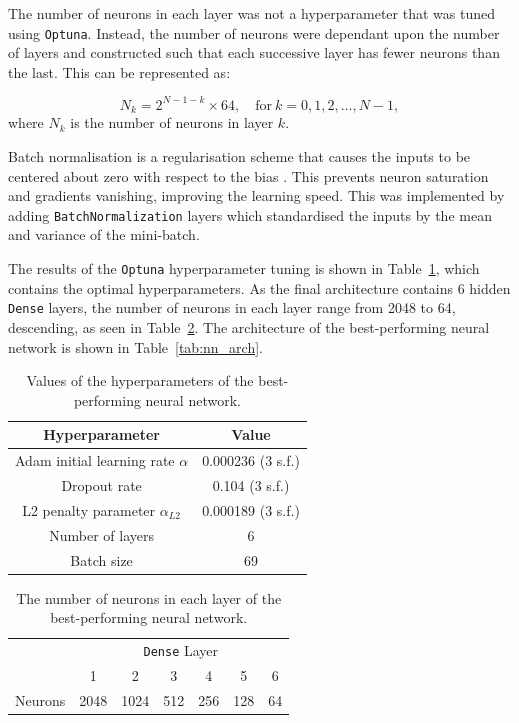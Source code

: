 \documentclass[11pt,a4paper]{article}
\begin{document}
The number of neurons in each layer was not a hyperparameter that was tuned using \texttt{Optuna}. Instead, the number of neurons were dependant upon the number of layers and constructed such that each successive layer has fewer neurons than the last. This can be represented as:

\begin{equation}
    N_k = 2^{N-1-k} \times 64, \quad\mathrm{for}\ k=0, 1, 2, \dots, N-1,
\end{equation}
where $N_k$ is the number of neurons in layer $k$.

Batch normalisation is a regularisation scheme that causes the inputs to be centered about zero with respect to the bias \citep{Mehta_2019}. This prevents neuron saturation and gradients vanishing, improving the learning speed. This was implemented by adding \texttt{BatchNormalization} layers which standardised the inputs by the mean and variance of the mini-batch.

The results of the \texttt{Optuna} hyperparameter tuning is shown in Table~\ref{tab:nn_hyperparameter}, which contains the optimal hyperparameters. As the final architecture contains 6 hidden \texttt{Dense} layers, the number of neurons in each layer range from 2048 to 64, descending, as seen in Table~\ref{tab:neurons}. The architecture of the best-performing neural network is shown in Table~\ref{tab:nn_arch}.

\begin{table}[ht]
    \centering
    \begin{tabular}{c|c}
        Hyperparameter & Value\\
        \hline
        Adam initial learning rate $\alpha$ & 0.000236 (3 s.f.) \\
        Dropout rate & 0.104 (3 s.f.) \\
        L2 penalty parameter $\alpha_{L2}$ & 0.000189 (3 s.f.) \\
        Number of layers & 6 \\
        Batch size & 69 \\
    \end{tabular}
    \caption{Values of the hyperparameters of the best-performing neural network.}\label{tab:nn_hyperparameter}
\end{table}

\begin{table}[ht]
    \centering
    \begin{tabular}{c|c|c|c|c|c|c}
        &\multicolumn{6}{c}{\texttt{Dense} Layer} \\
        \cline{2-7}
         & 1 & 2 &3 &4 &5&6\\
        \hline
        Neurons & 2048 & 1024 & 512 & 256 & 128 & 64 \\
    \end{tabular}
    \caption{The number of neurons in each layer of the best-performing neural network.}\label{tab:neurons}
\end{table}
\end{document}
